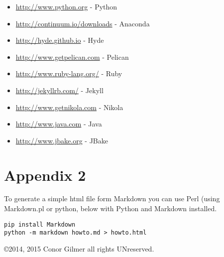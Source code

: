 \documentclass[12pt]{article}			%
\begin{document}
\begin{itemize}
\item\url{http://www.python.org} - Python
\item\url{http://continuum.io/downloads} - Anaconda
\item\url{http://hyde.github.io} - Hyde
\item\url{http://www.getpelican.com} - Pelican
\item\url{http://www.ruby-lang.org/} - Ruby
\item\url{http://jekyllrb.com/} - Jekyll
\item\url{http://www.getnikola.com} - Nikola
\item\url{http://www.java.com} - Java
\item\url{http://www.jbake.org} - JBake
\end{itemize}


\section{Appendix 2}
To generate a simple html file form Markdown you can use Perl (using Markdown.pl or python, below with Python and Markdown installed.
\begin{verbatim}
pip install Markdown
python -m markdown howto.md > howto.html
\end{verbatim}

\copyright 2014, 2015 Conor Gilmer  all rights UNreserved.
\end{document}
